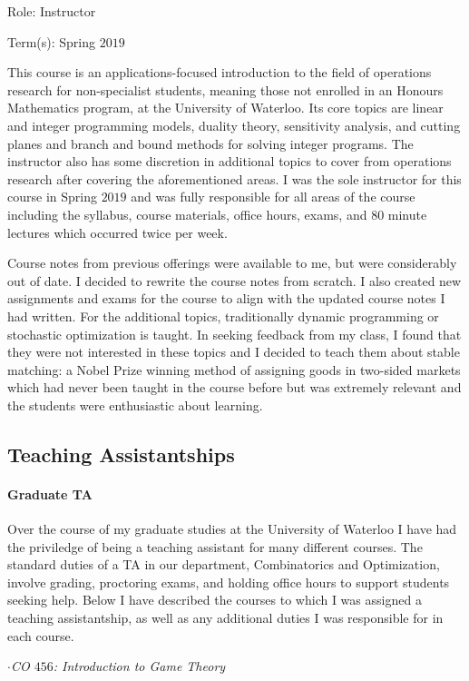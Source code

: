 \documentclass{article}
\begin{document}
 Role: Instructor
 
 Term(s): Spring $2019$

This course is an applications-focused introduction to the field of operations research for non-specialist students, meaning those not enrolled in an Honours Mathematics program, at the University of Waterloo. Its core topics are linear and integer programming models, duality theory, sensitivity analysis, and cutting planes and branch and bound methods for solving integer programs. The instructor also has some discretion in additional topics to cover from operations research after covering the aforementioned areas. I was the sole instructor for this course in Spring $2019$ and was fully responsible for all areas of the course including the syllabus, course materials, office hours, exams, and $80$ minute lectures which occurred twice per week. 

Course notes from previous offerings were available to me, but were considerably out of date. I decided to rewrite the course notes from scratch. I also created new assignments and exams for the course to align with the updated course notes I had written. For the additional topics, traditionally dynamic programming or stochastic optimization is taught. In seeking feedback from my class, I found that they were not interested in these topics and I decided to teach them about stable matching: a Nobel Prize winning method of assigning goods in two-sided markets which had never been taught in the course before but was extremely relevant and the students were enthusiastic about learning.

\subsection{Teaching Assistantships}
\paragraph{Graduate TA}Over the course of my graduate studies at the University of Waterloo I have had the priviledge of being a teaching assistant for many different courses. The standard duties of a TA in our department, Combinatorics and Optimization, involve grading, proctoring exams, and holding office hours to support students seeking help. Below I have described the courses to which I was assigned a teaching assistantship, as well as any additional duties I was responsible for in each course.
\bigskip

\noindent$\cdot$\emph{CO $456$: Introduction to Game Theory}
\end{document}
